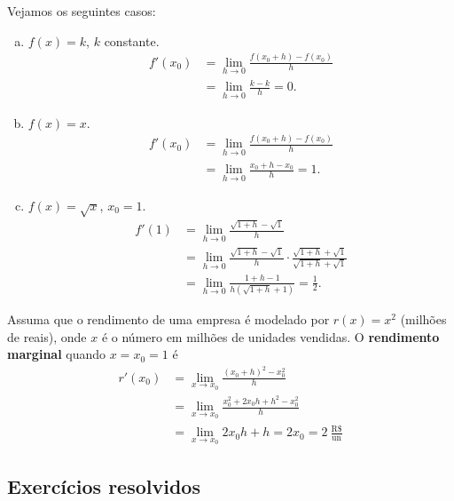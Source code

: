 \begin{ex}
  Vejamos os seguintes casos:
  \begin{enumerate}[a)]
  \item $f(x) = k$, $k$ constante.
    \begin{align}
      f'(x_0) &= \lim_{h\to 0} \frac{f(x_0+h)-f(x_0)}{h}\\
              &= \lim_{h\to 0} \frac{k-k}{h} = 0.
    \end{align}
  \item $f(x) = x$.
    \begin{align}
      f'(x_0) &= \lim_{h\to 0} \frac{f(x_0+h)-f(x_0)}{h} \\
              &= \lim_{h\to 0} \frac{x_0+h-x_0}{h} = 1.
    \end{align}
  \item $f(x) = \sqrt{x}$, $x_0=1$.
    \begin{align}
      f'(1) &= \lim_{h\to 0} \frac{\sqrt{1+h}-\sqrt{1}}{h}\\
            &= \lim_{h\to 0} \frac{\sqrt{1+h}-\sqrt{1}}{h} \cdot \frac{\sqrt{1+h}+\sqrt{1}}{\sqrt{1+h}+\sqrt{1}}\\
            &= \lim_{h\to 0} \frac{1+h-1}{h(\sqrt{1+h}+1)} = \frac{1}{2}.
    \end{align}
  \end{enumerate}
\end{ex}

\begin{ex}
  Assuma que o rendimento de uma empresa é modelado por $r(x) = x^2$ (milhões de reais), onde $x$ é o número em milhões de unidades vendidas. O {\bf rendimento marginal} quando $x=x_0=1$ é
  \begin{align}
    r'(x_0) &= \lim_{x\to x_0}\frac{(x_0+h)^2-x_0^2}{h}\\
            &= \lim_{x\to x_0}\frac{x_0^2+2x_0h+h^2-x_0^2}{h}\\
            &= \lim_{x\to x_0} 2x_0h + h = 2x_0 = 2~\frac{\text{R\$}}{\text{un}}
  \end{align}
\end{ex}

\subsection*{Exercícios resolvidos}

